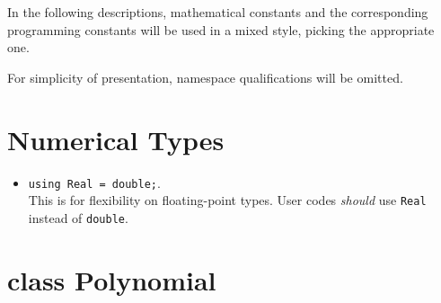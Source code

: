 \documentclass[12pt]{article}
\begin{document}
\maketitle

In the following descriptions, mathematical constants and the corresponding 
programming constants will be used in a mixed style, picking the appropriate one.

For simplicity of presentation, namespace qualifications will be omitted.

\section{Numerical Types}

    \begin{itemize}
        \item \texttt{using Real = double;}. \\
              This is for flexibility on floating-point types. User codes \textit{should} use \texttt{Real}
              instead of \texttt{double}.
    \end{itemize}
    
\section{class Polynomial}
\end{document}
